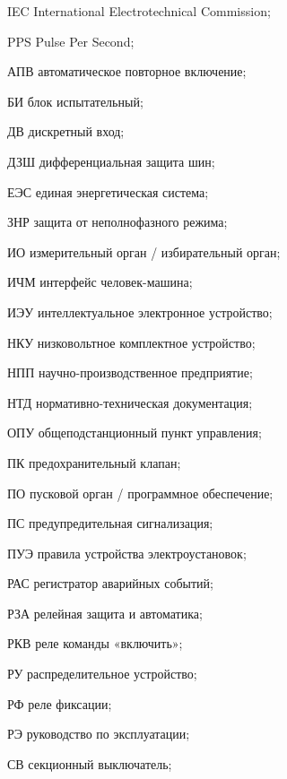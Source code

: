 \begin{list}{}%
{%
  \setlength{\labelwidth}{\abbrwidth}%
  \setlength{\labelsep}{0pt}%
  \setlength{\leftmargin}{\dimexpr\labelwidth+\labelsep\relax}%
  \setlength{\itemindent}{0pt}%
  \setlength{\parsep}{0pt}%
  \setlength{\itemsep}{0pt}
  \renewcommand{\makelabel}[1]{#1 --\hspace{\abbrgap}}%
}
\item[IEC]  International Electrotechnical Commission;
\item[PPS] Pulse Per Second;
\item[АПВ] автоматическое повторное включение;
\item[БИ] блок испытательный;
\item[ДВ] дискретный вход;
\item[ДЗШ] дифференциальная защита шин;
\item[ЕЭС] единая энергетическая система;
\item[ЗНР] защита от неполнофазного режима;
\item[ИО] измерительный орган / избирательный орган;
\item[ИЧМ] интерфейс человек-машина;
\item[ИЭУ] интеллектуальное электронное устройство;
\item[НКУ] низковольтное комплектное устройство;
\item[НПП] научно-производственное предприятие;
\item[НТД] нормативно-техническая документация;
\item[ОПУ] общеподстанционный пункт управления;
\item[ПК] предохранительный клапан;
\item[ПО] пусковой орган / программное обеспечение;
\item[ПС] предупредительная сигнализация;
\item[ПУЭ] правила устройства электроустановок;
\item[РАС] регистратор аварийных событий;
\item[РЗА] релейная защита и автоматика;
\item[РКВ] реле команды «включить»;
\item[РУ] распределительное устройство;
\item[РФ] реле фиксации;
\item[РЭ] руководство по эксплуатации;
\item[СВ] секционный выключатель;

\end{list}
